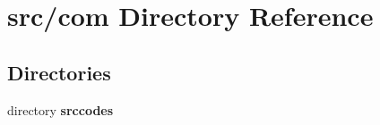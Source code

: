 \section{src/com Directory Reference}
\label{dir_541eb0a6c58a7690acc5b848a4b1b724}
\subsection*{Directories}
\begin{DoxyCompactItemize}
\item 
directory {\bf srccodes}
\end{DoxyCompactItemize}
